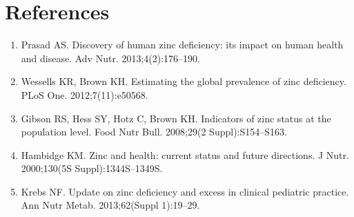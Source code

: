 \section*{References}
\begin{enumerate}
  \item Prasad AS. Discovery of human zinc deficiency: its impact on human health and disease. Adv Nutr. 2013;4(2):176--190.
  \item Wessells KR, Brown KH. Estimating the global prevalence of zinc deficiency. PLoS One. 2012;7(11):e50568.
  \item Gibson RS, Hess SY, Hotz C, Brown KH. Indicators of zinc status at the population level. Food Nutr Bull. 2008;29(2 Suppl):S154--S163.
  \item Hambidge KM. Zinc and health: current status and future directions. J Nutr. 2000;130(5S Suppl):1344S--1349S.
  \item Krebs NF. Update on zinc deficiency and excess in clinical pediatric practice. Ann Nutr Metab. 2013;62(Suppl 1):19--29.
\end{enumerate}

\clearpage
